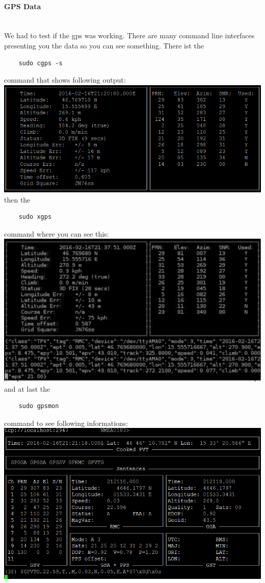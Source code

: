 \paragraph{GPS Data} \mbox{}\\
We had to test if the \gls{gps} was working. There are many command line interfaces presenting you the data so you can see something.\newline
There ist the 
\begin{verbatim}
	sudo cgps -s
\end{verbatim}
command that shows following output: \newline
\includegraphics[scale=0.7]{bilder/scr1}
\newline
then the
\begin{verbatim}
	sudo xgps
\end{verbatim}
command where you can see this:\newline
\includegraphics[scale=0.9]{bilder/scr2}
\newline
and at last the 
\begin{verbatim}
	sudo gpsmon
\end{verbatim}
command to see following informations: \newline
\includegraphics[scale=0.7]{bilder/scr3}

